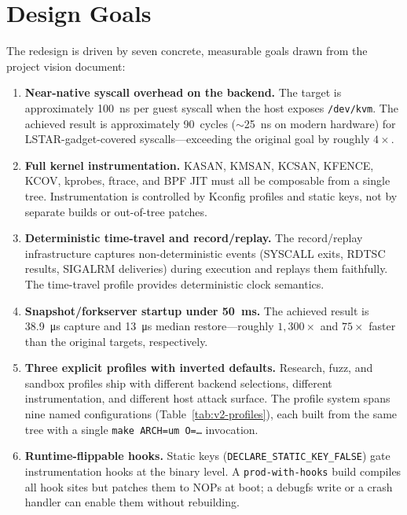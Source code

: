 \section{Design Goals}
\label{sec:v2-goals}

The redesign is driven by seven concrete, measurable goals drawn from
the project vision document:

\begin{enumerate}[leftmargin=2em]
  \item \textbf{Near-native syscall overhead on the \KVM{} backend.}
    The target is approximately \SI{100}{\nano\second} per guest syscall
    when the host exposes \texttt{/dev/kvm}.  The achieved result is
    approximately 90~cycles ($\sim$\SI{25}{\nano\second} on modern
    hardware) for LSTAR-gadget-covered syscalls---exceeding the
    original goal by roughly $4\times$.

  \item \textbf{Full kernel instrumentation.}
    KASAN, KMSAN, KCSAN, KFENCE, KCOV, kprobes, ftrace, and BPF JIT
    must all be composable from a single tree.  Instrumentation is
    controlled by Kconfig profiles and static keys, not by separate
    builds or out-of-tree patches.

  \item \textbf{Deterministic time-travel and record/replay.}
    The record/replay infrastructure captures non-deterministic events
    (SYSCALL exits, RDTSC results, SIGALRM deliveries) during
    execution and replays them faithfully.  The time-travel profile
    provides deterministic clock semantics.

  \item \textbf{Snapshot/forkserver startup under \SI{50}{\milli\second}.}
    The achieved result is \SI{38.9}{\micro\second} capture and
    \SI{13}{\micro\second} median restore---roughly $1{,}300\times$
    and $75\times$ faster than the original targets, respectively.

  \item \textbf{Three explicit profiles with inverted defaults.}
    Research, fuzz, and sandbox profiles ship with different backend
    selections, different instrumentation, and different host attack
    surface.  The profile system spans nine named configurations
    (Table~\ref{tab:v2-profiles}), each built from the same tree
    with a single \texttt{make ARCH=um O=\ldots} invocation.

  \item \textbf{Runtime-flippable hooks.}
    Static keys (\texttt{DECLARE\_STATIC\_KEY\_FALSE}) gate
    instrumentation hooks at the binary level.  A
    \texttt{prod-with-hooks} build compiles all hook sites but
    patches them to NOPs at boot; a debugfs write or a crash handler
    can enable them without rebuilding.


\end{enumerate}
